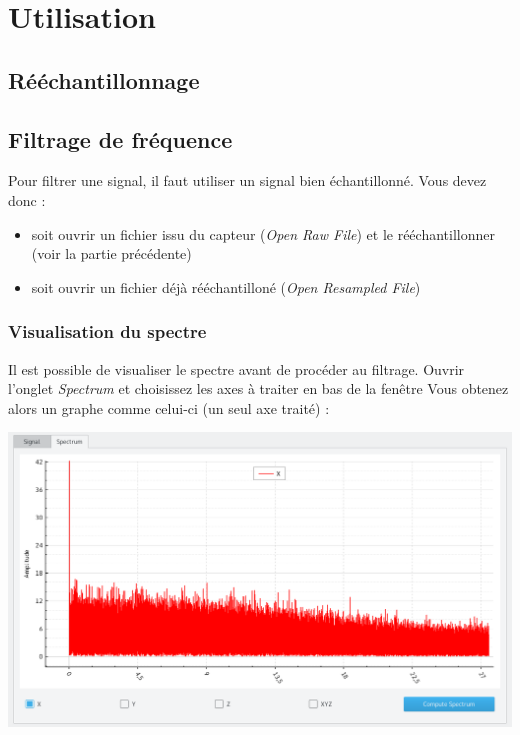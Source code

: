 \documentclass[a4paper,12pt]{article}
\begin{document}
\section{Utilisation}
\subsection{Rééchantillonnage}
\subsubsection{}

\subsection{Filtrage de fréquence}
Pour filtrer une signal, il faut utiliser un signal bien échantillonné.
Vous devez donc :
\begin{itemize}
 \item soit ouvrir un fichier issu du capteur (\emph{Open Raw File}) et le rééchantillonner (voir la partie précédente)
 \item soit ouvrir un fichier déjà rééchantilloné (\emph{Open Resampled File})
\end{itemize}
\subsubsection{Visualisation du spectre}
Il est possible de visualiser le spectre avant de procéder au filtrage. 
Ouvrir l'onglet \emph{Spectrum} et choisissez les axes à traiter en bas de la fenêtre
Vous obtenez alors un graphe comme celui-ci (un seul axe traité) :
\begin{center}
 \includegraphics[width=17cm]{img/graphSpectrum.png}
\end{center}
\end{document}

